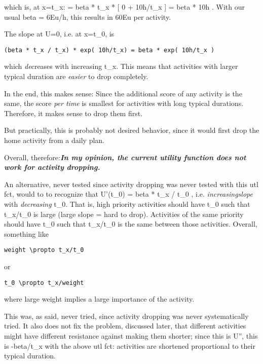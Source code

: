 \documentclass[a4paper,11pt]{report}
\begin{document}
which   is, at x=t\_x: = beta * t\_x * [ 0 + 10h/t\_x ] = beta *  10h . With  our usual beta = 6Eu/h, this results in 60Eu per  activity.

The slope at U=0, i.e. at x=t\_0, is
\begin{verbatim}
(beta * t_x / t_x) * exp( 10h/t_x) = beta * exp( 10h/t_x )
\end{verbatim}

which \emph{de}creases with increasing t\_x. This means that activities with larger typical duration are \emph{easier} to drop completely.

In the end, this makes sense: Since the additional score of any activity is the same, the score \emph{per time} is smallest for activities with long typical durations. Therefore, it makes sense to drop them first.

But practically, this is probably not desired behavior, since it would first drop the home activity from a daily plan.

Overall, therefore:\emph{\textbf{In my opinion, the current utility function does not work for activity dropping.}}



An  alternative, never tested since activity dropping was never  tested with  this utl fct, would to to recognize that U'(t\_0) = beta *  t\_x / t\_0 ,  i.e. \emph{increasing}\emph{slope} with \emph{decreasing}  t\_0.  That is, high priority activities should have t\_0 such that  t\_x/t\_0 is  large (large slope = hard to drop). Activities of the  same priority  should have t\_0 such that t\_x/t\_0 is the same between  those activities.  Overall, something like
\begin{verbatim}
weight \propto t_x/t_0

\end{verbatim}

or
\begin{verbatim}
t_0 \propto t_x/weight
\end{verbatim}

where large weight implies a large importance of the activity.

This  was, as said, never tried, since activity dropping was never   systematically tried. It also does not fix the problem, discussed   later, that different activities might have different resistance  against  making them shorter; since this is U'', this is -beta/t\_x  with the  above utl fct: activities are shortened proportional to their  typical  duration.
\end{document}
